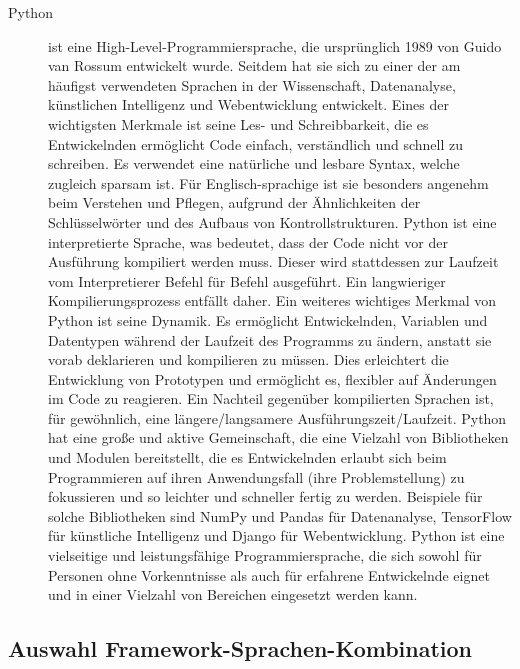 \begin{description}
    \item[Python] ist eine High-Level-Programmiersprache, die ursprünglich 1989 von Guido van Rossum entwickelt wurde.
    Seitdem hat sie sich zu einer der am häufigst verwendeten Sprachen in der Wissenschaft, Datenanalyse, künstlichen Intelligenz und Webentwicklung entwickelt.
    Eines der wichtigsten Merkmale ist seine Les- und Schreibbarkeit, die es Entwickelnden ermöglicht Code einfach, verständlich und schnell zu schreiben.
    Es verwendet eine natürliche und lesbare Syntax, welche zugleich sparsam ist.
    Für Englisch-sprachige ist sie besonders angenehm beim Verstehen und Pflegen, aufgrund der Ähnlichkeiten der Schlüsselwörter und des Aufbaus von Kontrollstrukturen.
    Python ist eine interpretierte Sprache, was bedeutet, dass der Code nicht vor der Ausführung kompiliert werden muss.
    Dieser wird stattdessen zur Laufzeit vom \sog Interpretierer Befehl für Befehl ausgeführt.
    Ein \ggf langwieriger Kompilierungsprozess entfällt daher.
    Ein weiteres wichtiges Merkmal von Python ist seine Dynamik.
    Es ermöglicht Entwickelnden, Variablen und Datentypen während der Laufzeit des Programms zu ändern, anstatt sie vorab deklarieren und kompilieren zu müssen.
    Dies erleichtert die Entwicklung von Prototypen und ermöglicht es, flexibler auf Änderungen im Code zu reagieren.
    Ein Nachteil gegenüber kompilierten Sprachen ist, für gewöhnlich, eine längere/langsamere Ausführungszeit/Laufzeit.
    Python hat eine große und aktive Gemeinschaft, die eine Vielzahl von Bibliotheken und Modulen bereitstellt, die es Entwickelnden erlaubt sich beim Programmieren auf ihren Anwendungsfall (ihre Problemstellung) zu fokussieren und so leichter und schneller fertig zu werden.
    Beispiele für solche Bibliotheken sind NumPy und Pandas für Datenanalyse, TensorFlow für künstliche Intelligenz und Django für Webentwicklung.
    Python ist eine vielseitige und leistungsfähige Programmiersprache, die sich sowohl für Personen ohne Vorkenntnisse als auch für erfahrene Entwickelnde eignet und in einer Vielzahl von Bereichen eingesetzt werden kann.
\end{description}


\subsection{Auswahl Framework-Sprachen-Kombination}\label{subsec:auswahl-framework-sprachen-kombination}

